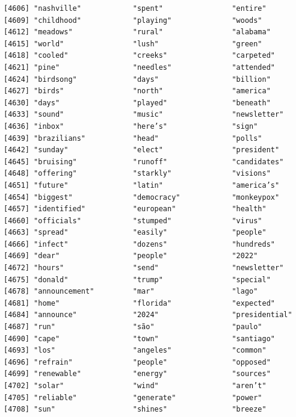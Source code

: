 \documentclass[
  letterpaper,
  DIV=11,
  numbers=noendperiod]{scrartcl}
\begin{document}
\begin{verbatim}
[4606] "nashville"            "spent"                "entire"              
[4609] "childhood"            "playing"              "woods"               
[4612] "meadows"              "rural"                "alabama"             
[4615] "world"                "lush"                 "green"               
[4618] "cooled"               "creeks"               "carpeted"            
[4621] "pine"                 "needles"              "attended"            
[4624] "birdsong"             "days"                 "billion"             
[4627] "birds"                "north"                "america"             
[4630] "days"                 "played"               "beneath"             
[4633] "sound"                "music"                "newsletter"          
[4636] "inbox"                "here’s"               "sign"                
[4639] "brazilians"           "head"                 "polls"               
[4642] "sunday"               "elect"                "president"           
[4645] "bruising"             "runoff"               "candidates"          
[4648] "offering"             "starkly"              "visions"             
[4651] "future"               "latin"                "america’s"           
[4654] "biggest"              "democracy"            "monkeypox"           
[4657] "identified"           "european"             "health"              
[4660] "officials"            "stumped"              "virus"               
[4663] "spread"               "easily"               "people"              
[4666] "infect"               "dozens"               "hundreds"            
[4669] "dear"                 "people"               "2022"                
[4672] "hours"                "send"                 "newsletter"          
[4675] "donald"               "trump"                "special"             
[4678] "announcement"         "mar"                  "lago"                
[4681] "home"                 "florida"              "expected"            
[4684] "announce"             "2024"                 "presidential"        
[4687] "run"                  "são"                  "paulo"               
[4690] "cape"                 "town"                 "santiago"            
[4693] "los"                  "angeles"              "common"              
[4696] "refrain"              "people"               "opposed"             
[4699] "renewable"            "energy"               "sources"             
[4702] "solar"                "wind"                 "aren’t"              
[4705] "reliable"             "generate"             "power"               
[4708] "sun"                  "shines"               "breeze"              

\end{verbatim}
\end{document}
